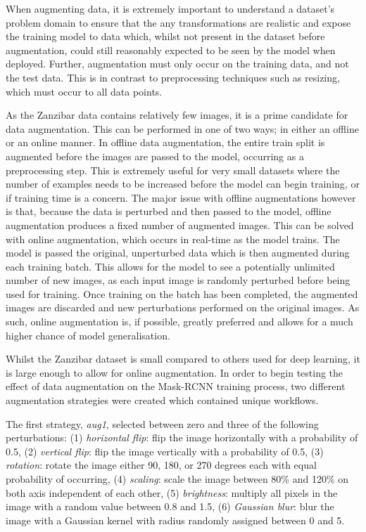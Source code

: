 When augmenting data, it is extremely important to understand a dataset's problem domain to ensure that the any transformations are realistic and expose the training model to data which, whilst not present in the dataset before augmentation, could still reasonably expected to be seen by the model when deployed. Further, augmentation must only occur on the training data, and not the test data. This is in contrast to preprocessing techniques such as resizing, which must occur to all data points. 

As the Zanzibar data contains relatively few images, it is a prime candidate for data augmentation. This can be performed in one of two ways; in either an offline or an online manner. In offline data augmentation, the entire train split is augmented before the images are passed to the model, occurring as a preprocessing step. This is extremely useful for very small datasets where the number of examples needs to be increased before the model can begin training, or if training time is a concern. The major issue with offline augmentations however is that, because the data is perturbed and then passed to the model, offline augmentation produces a fixed number of augmented images. This can be solved with online augmentation, which occurs in real-time as the model trains. The model is passed the original, unperturbed data which is then augmented during each training batch. This allows for the model to see a potentially unlimited number of new images, as each input image is randomly perturbed before being used for training. Once training on the batch has been completed, the augmented images are discarded and new perturbations performed on the original images. As such, online augmentation is, if possible, greatly preferred and allows for a much higher chance of model generalisation. 

Whilst the Zanzibar dataset is small compared to others used for deep learning, it is large enough to allow for online augmentation. In order to begin testing the effect of data augmentation on the Mask-RCNN training process, two different augmentation strategies were created which contained unique workflows. 

The first strategy, \textit{aug1}, selected between zero and three of the following perturbations: (1) \textit{horizontal flip}: flip the image horizontally with a probability of 0.5, (2) \textit{vertical flip}: flip the image vertically with a probability of 0.5, (3) \textit{rotation}: rotate the image either 90, 180, or 270 degrees each with equal probability of occurring, (4) \textit{scaling}: scale the image between 80\% and 120\% on both axis independent of each other, (5) \textit{brightness}: multiply all pixels in the image with a random value between 0.8 and 1.5, (6) \textit{Gaussian blur}: blur the image with a Gaussian kernel with radius randomly assigned between 0 and  5. 


